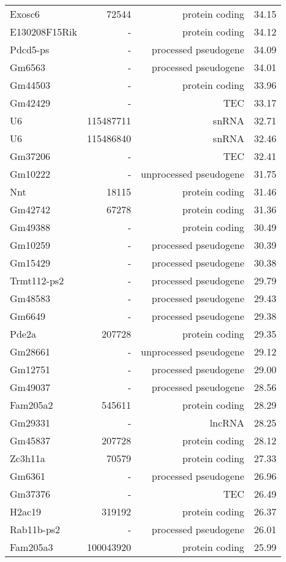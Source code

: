 \begin{longtable}[t]{lrrr}
Exosc6 & 72544 & protein coding & 34.15\\
\addlinespace
E130208F15Rik & - & protein coding & 34.12\\
Pdcd5-ps & - & processed pseudogene & 34.09\\
Gm6563 & - & processed pseudogene & 34.01\\
Gm44503 & - & protein coding & 33.96\\
Gm42429 & - & TEC & 33.17\\
\addlinespace
U6 & 115487711 & snRNA & 32.71\\
U6 & 115486840 & snRNA & 32.46\\
Gm37206 & - & TEC & 32.41\\
Gm10222 & - & unprocessed pseudogene & 31.75\\
Nnt & 18115 & protein coding & 31.46\\
\addlinespace
Gm42742 & 67278 & protein coding & 31.36\\
Gm49388 & - & protein coding & 30.49\\
Gm10259 & - & processed pseudogene & 30.39\\
Gm15429 & - & processed pseudogene & 30.38\\
Trmt112-ps2 & - & processed pseudogene & 29.79\\
\addlinespace
Gm48583 & - & processed pseudogene & 29.43\\
Gm6649 & - & processed pseudogene & 29.38\\
Pde2a & 207728 & protein coding & 29.35\\
Gm28661 & - & unprocessed pseudogene & 29.12\\
Gm12751 & - & processed pseudogene & 29.00\\
\addlinespace
Gm49037 & - & processed pseudogene & 28.56\\
Fam205a2 & 545611 & protein coding & 28.29\\
Gm29331 & - & lncRNA & 28.25\\
Gm45837 & 207728 & protein coding & 28.12\\
Zc3h11a & 70579 & protein coding & 27.33\\
\addlinespace
Gm6361 & - & processed pseudogene & 26.96\\
Gm37376 & - & TEC & 26.49\\
H2ac19 & 319192 & protein coding & 26.37\\
Rab11b-ps2 & - & processed pseudogene & 26.01\\
Fam205a3 & 100043920 & protein coding & 25.99\\

\end{longtable}
